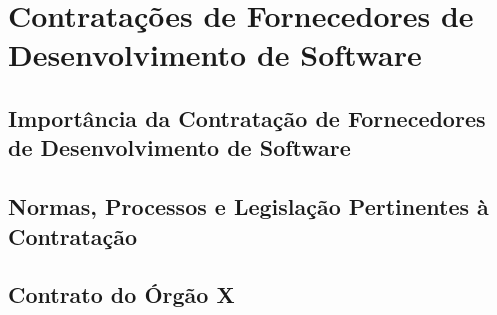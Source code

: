 \chapter{Contratações de Fornecedores de Desenvolvimento de Software}
\label{chap:contratos}

\section{Importância da Contratação de Fornecedores de Desenvolvimento de Software}




\section{Normas, Processos e Legislação Pertinentes à Contratação}



\section{Contrato do Órgão X}




